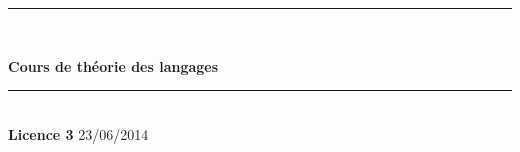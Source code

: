\documentclass[11pt,twoside,openright,a4paper]{report}
\begin{document}
\begin{titlepage}
\begin{Large}
\baselineskip=7mm
\noindent
\hfill

\begin{center}
\rule{\textwidth}{0.5 mm}\\
{\huge\sffamily\bfseries\baselineskip=1cm
Cours de théorie des langages
\par}
\rule{\textwidth}{0.5 mm}\\
{\Large\sffamily\bfseries Licence 3}
\vskip 5mm
23/06/2014
\end{center}

\vfill

\end{Large}
\end{titlepage}

\cleardoublepage

\tableofcontents

\pagestyle{fancy}

% 




\end{document}
